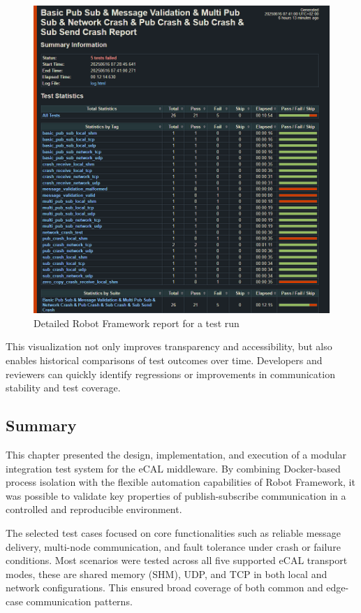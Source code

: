 \begin{figure}[H]
	\centering
	\includegraphics[width=\textwidth]{Images/robot_report_example.png}
	\caption{Detailed Robot Framework report for a test run}
	\label{fig:robot_report}
\end{figure}

\vspace{0.5em}
This visualization not only improves transparency and accessibility, but also enables historical comparisons of test outcomes over time. Developers and reviewers can quickly identify regressions or improvements in communication stability and test coverage.

\newpage
\subsection{Summary}

This chapter presented the design, implementation, and execution of a modular integration test system for the eCAL middleware. By combining Docker-based process isolation with the flexible automation capabilities of Robot Framework, it was possible to validate key properties of publish-subscribe communication in a controlled and reproducible environment.

\vspace{1em}
The selected test cases focused on core functionalities such as reliable message delivery, multi-node communication, and fault tolerance under crash or failure conditions. Most scenarios were tested across all five supported eCAL transport modes, these are shared memory (SHM), UDP, and TCP in both local and network configurations. This ensured broad coverage of both common and edge-case communication patterns.

